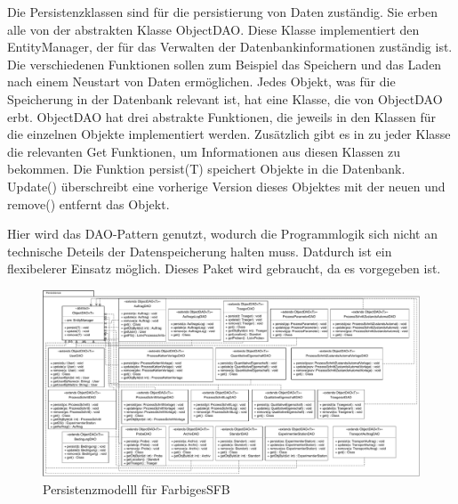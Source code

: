 \documentclass[enabledeprecatedfontcommands,fontsize=12pt,paper=a4,twoside]{scrartcl}
\begin{document}
{
Die Persistenzklassen sind für die persistierung von Daten zuständig. Sie erben alle von der abstrakten Klasse ObjectDAO. Diese Klasse implementiert den EntityManager, der für das Verwalten der Datenbankinformationen zuständig ist. Die verschiedenen Funktionen sollen zum Beispiel das Speichern und das Laden nach einem Neustart von Daten ermöglichen. Jedes Objekt, was für die Speicherung in der Datenbank relevant ist, hat eine Klasse, die von ObjectDAO erbt. ObjectDAO hat drei abstrakte Funktionen, die jeweils in den Klassen für die einzelnen Objekte implementiert werden. Zusätzlich gibt es in zu jeder Klasse die relevanten Get Funktionen, um Informationen aus diesen Klassen zu bekommen. Die Funktion persist(T) speichert Objekte in die Datenbank. Update() überschreibt eine vorherige Version dieses Objektes mit der neuen und remove() entfernt das Objekt.

Hier wird das DAO-Pattern genutzt, wodurch die Programmlogik sich nicht an technische Deteils der Datenspeicherung halten muss. Datdurch ist ein flexibelerer Einsatz möglich. 
Dieses Paket wird gebraucht, da es vorgegeben ist. 
}

 \begin{figure}
  \caption{Persistenzmodelll für FarbigesSFB}
  \centering
  \includegraphics[width=\textwidth]{UML/Persistence}
 \end{figure}
 \newpage
\end{document}
